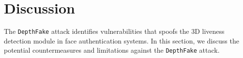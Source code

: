 
\section{Discussion}
The \texttt{DepthFake} attack identifies vulnerabilities that spoofs the 3D liveness detection module in face authentication systems.
 In this section, we discuss the potential countermeasures and limitations against the \texttt{DepthFake} attack.





